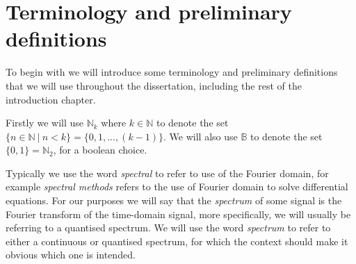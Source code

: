 \documentclass[12pt,twoside,notitlepage]{report}
\newcommand{\bb}[1]{\mathbb{#1}}
\begin{document}
    \section{Terminology and preliminary definitions} \label{sec:term_and_def}
        To begin with we will introduce some terminology and preliminary definitions that we will use throughout the 
        dissertation, including the rest of the introduction chapter.

        Firstly we will use $\bb{N}_k$ where $k\in \bb{N}$ to denote the set $\{ n \in \bb{N}\ |\ n < k \} = 
        \{0, 1, ..., (k-1)\}$. We will also use $\bb{B}$ to denote the set $\{0, 1\} = \bb{N}_2$, for a boolean choice.

        Typically we use the word \textit{spectral} to refer to use of the Fourier domain, for example 
        \textit{spectral methods} refers to the use of Fourier domain to solve differential equations. For our purposes 
        we will say that the \textit{spectrum} of some signal is the Fourier transform of the time-domain signal, more 
        specifically, we will usually be referring to a quantised spectrum. We will use the word \textit{spectrum} to 
        refer to either a continuous or quantised spectrum, for which the context should make it obvious which one is 
        intended. 
\end{document}
